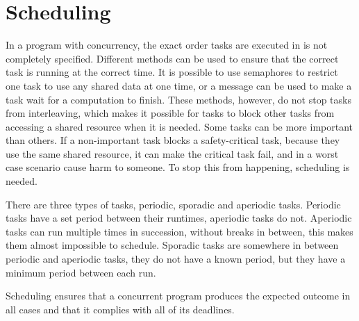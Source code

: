 \section{Scheduling}
In a program with concurrency, the exact order tasks are executed in is not completely specified. Different methods can be used to ensure that the correct task is running at the correct time. It is possible to use semaphores to restrict one task to use any shared data at one time, or a message can be used to make a task wait for a computation to finish. These methods, however, do not stop tasks from interleaving, which makes it possible for tasks to block other tasks from accessing a shared resource when it is needed. Some tasks can be more important than others. If a non-important task blocks a safety-critical task, because they use the same shared resource, it can make the critical task fail, and in a worst case scenario cause harm to someone. To stop this from happening,  scheduling is needed\cite{rts-book}.

There are three types of tasks, periodic, sporadic and aperiodic tasks. Periodic tasks have a set period between their runtimes, aperiodic tasks do not. Aperiodic tasks can run multiple times in succession, without breaks in between, this makes them almost impossible to schedule. Sporadic tasks are somewhere in between periodic and aperiodic tasks, they do not have a known period, but they have a minimum period between each run.

Scheduling ensures that a concurrent program produces the expected outcome in all cases and that it complies with all of its deadlines.
